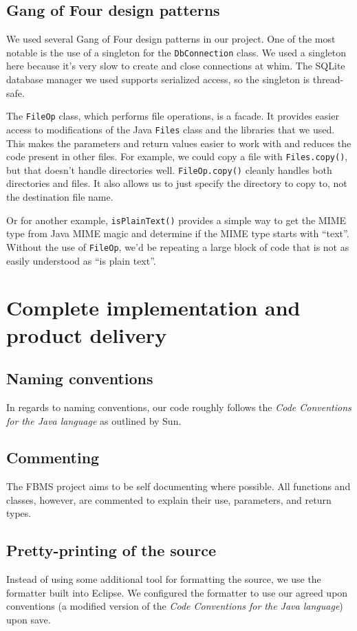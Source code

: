 \documentclass[12pt,a4paper]{article}
\begin{document}
\subsection{Gang of Four design patterns}
We used several Gang of Four design patterns in our project. One of the most notable is the use of a singleton for the \texttt{DbConnection} class. We used a singleton here because it's very slow to create and close connections at whim. The SQLite database manager we used supports serialized access, so the singleton is thread-safe.

The \texttt{FileOp} class, which performs file operations, is a facade. It provides easier access to modifications of the Java \texttt{Files} class and the libraries that we used. This makes the parameters and return values easier to work with and reduces the code present in other files. For example, we could copy a file with \texttt{Files.copy()}, but that doesn't handle directories well. \texttt{FileOp.copy()} cleanly handles both directories and files. It also allows us to just specify the directory to copy to, not the destination file name.

Or for another example, \texttt{isPlainText()} provides a simple way to get the MIME type from Java MIME magic and determine if the MIME type starts with ``text''. Without the use of \texttt{FileOp}, we'd be repeating a large block of code that is not as easily understood as ``is plain text''.

\section{Complete implementation and product delivery}

\subsection{Naming conventions}
In regards to naming conventions, our code roughly follows the \textit{Code Conventions for the Java language}\cite{conventions} as outlined by Sun.

\subsection{Commenting}
The FBMS project aims to be self documenting where possible. All functions and classes, however, are commented to explain their use, parameters, and return types.

\subsection{Pretty-printing of the source}
Instead of using some additional tool for formatting the source, we use the formatter built into Eclipse\cite{eclipse}. We configured the formatter to use our agreed upon conventions (a modified version of the \textit{Code Conventions for the Java language}\cite{conventions}) upon save.
\end{document}
